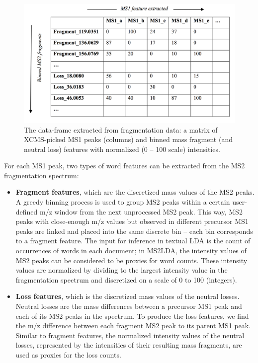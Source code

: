 \begin{figure}[!htbp]
\centering\includegraphics[width=0.8\linewidth]{07-lda/figures/matrix.png}
\centering\caption{The data-frame extracted from fragmentation data: a matrix of XCMS-picked MS1 peaks (columns) and binned mass fragment (and neutral loss) features with normalized (0 – 100 scale) intensities.\label{fig:m2lda-matrix}}
\end{figure}

For each MS1 peak, two types of word features can be extracted from the MS2 fragmentation spectrum:
\begin{itemize}
\item \textbf{Fragment features}, which are the discretized mass values of the MS2 peaks. A greedy binning process is used to group MS2 peaks within a certain user-defined m/z window from the next unprocessed MS2 peak. This way, MS2 peaks with close-enough m/z values but observed in different precursor MS1 peaks are linked and placed into the same discrete bin – each bin corresponds to a fragment feature. The input for inference in textual LDA is the count of occurrences of words in each document; in MS2LDA, the intensity values of MS2 peaks can be considered to be proxies for word counts. These intensity values are normalized by dividing to the largest intensity value in the fragmentation spectrum and discretized on a scale of 0 to 100 (integers). 
\item \textbf{Loss features}, which is the discretized mass values of the neutral losses. Neutral losses are the mass differences between a precursor MS1 peak and each of its MS2 peaks in the spectrum. To produce the loss features, we find the m/z difference between each fragment MS2 peak to its parent MS1 peak. Similar to fragment features, the normalized intensity values of the neutral losses, represented by the intensities of their resulting mass fragments, are used as proxies for the loss counts.
\end{itemize}

